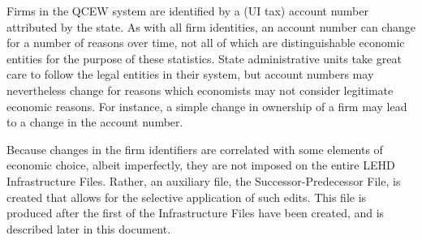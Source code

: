 Firms in the
QCEW system are identified by a (UI tax) account number attributed by the
state. As with all firm identities, an account number can change for a
number of reasons over time, not all of which are distinguishable economic
entities for the purpose of these statistics. State administrative units take great care to
follow the legal entities in their system, but account numbers may
nevertheless change for reasons which economists may not consider
legitimate economic reasons. For instance, a simple change in ownership of
a firm may lead to a change in the account number. 

Because changes in the firm identifiers are correlated with some elements
of economic choice, albeit imperfectly, they are not imposed on the entire
LEHD Infrastructure Files. Rather, an auxiliary file, the
Successor-Predecessor File, is created that allows for the  selective
application of such edits. This file is produced after the first of the Infrastructure
Files have been created, and is described later in this document.


